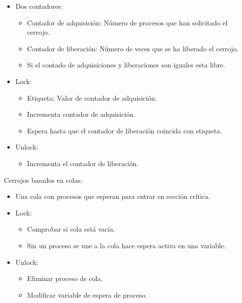 \documentclass[12pt, twoside, openright]{report} %
\begin{document}
    \begin{itemize}
    
    \item
      Dos contadores:

      \begin{itemize}
      
      \item
        Contador de adquisición: Número de procesos que han solicitado
        el cerrojo.
      \item
        Contador de liberación: Número de veces que se ha liberado el
        cerrojo.
      \item
        Si el contado de adquisiciones y liberaciones son iguales esta
        libre.
      \end{itemize}
    \item
      Lock:

      \begin{itemize}
      
      \item
        Etiqueta: Valor de contador de adquisición.
      \item
        Incrementa contador de adquisición.
      \item
        Espera hasta que el contador de liberación coincida con
        etiqueta.
      \end{itemize}
    \item
      Unlock:

      \begin{itemize}
      
      \item
        Incrementa el contador de liberación.
      \end{itemize}
    \end{itemize}

    Cerrojos basados en colas:

    \begin{itemize}
    
    \item
      Una cola con procesos que esperan para entrar en sección
      crítica.
    \item
      Lock:

      \begin{itemize}
      
      \item
        Comprobar si cola está vacía.
      \item
        Sin un proceso se une a la cola hace espera activa en una
        variable.
      \end{itemize}
    \item
      Unlock:

      \begin{itemize}
      
      \item
        Eliminar proceso de cola.
      \item
        Modificar variable de espera de proceso.
      \end{itemize}
    \end{itemize}
\pagebreak
\end{document}
